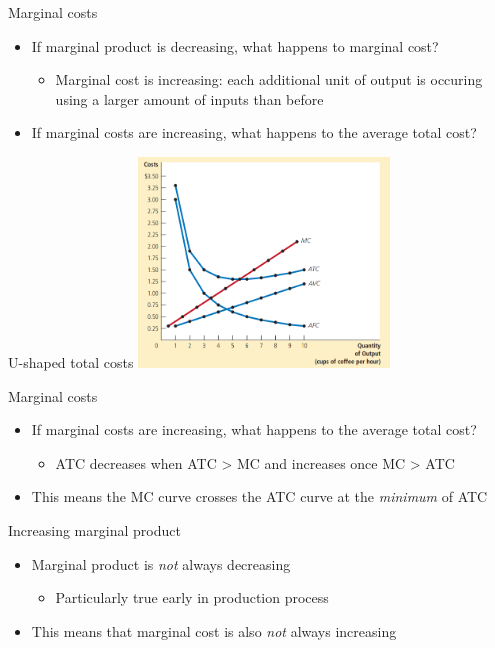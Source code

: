 \documentclass[aspectratio=169]{beamer}
\begin{document}
\begin{frame}{Marginal costs}
    \begin{itemize}
        \item If marginal product is decreasing, what happens to marginal cost?
            \begin{itemize}
                \item Marginal cost is increasing: each additional unit of output is occuring using a larger amount of inputs than before
            \end{itemize}
        \item If marginal costs are increasing, what happens to the average total cost?
    \end{itemize}
\end{frame}

\begin{frame}{U-shaped total costs}
    \centering
    \includegraphics[width = 0.5\textwidth,keepaspectratio]{../figs/uTC.png}
\end{frame}

\begin{frame}{Marginal costs}
    \begin{itemize}
        \item If marginal costs are increasing, what happens to the average total cost?
            \begin{itemize}
                \item ATC decreases when ATC > MC and increases once MC > ATC
            \end{itemize}
        \item This means the MC curve crosses the ATC curve at the \textit{minimum} of ATC
    \end{itemize}
\end{frame}

\begin{frame}{Increasing marginal product}
    \begin{itemize}
        \item Marginal product is \textit{not} always decreasing
            \begin{itemize}
                \item Particularly true early in production process
            \end{itemize}
        \item This means that marginal cost is also \textit{not} always increasing
    \end{itemize}
\end{frame}
\end{document}
